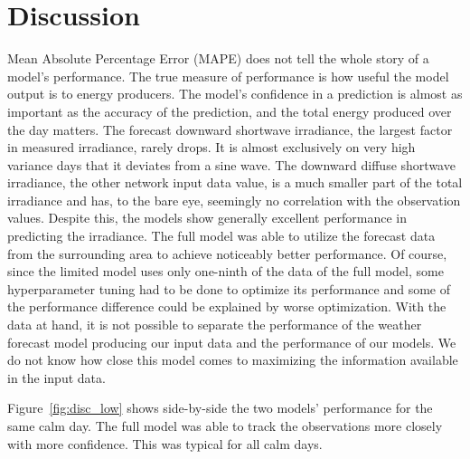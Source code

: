 \chapter{Discussion}
Mean Absolute Percentage Error (MAPE) does not tell the whole story of a model's performance. The true measure of performance is how useful the model output is to energy producers. The model's confidence in a prediction is almost as important as the accuracy of the prediction, and the total energy produced over the day matters.
The forecast downward shortwave irradiance, the largest factor in measured irradiance, rarely drops. It is almost exclusively on very high variance days that it deviates from a sine wave. The downward diffuse shortwave irradiance, the other network input data value, is a much smaller part of the total irradiance and has, to the bare eye, seemingly no correlation with the observation values. Despite this, the models show generally excellent performance in predicting the irradiance.
The full model was able to utilize the forecast data from the surrounding area to achieve noticeably better performance. Of course, since the limited model uses only one-ninth of the data of the full model, some hyperparameter tuning had to be done to optimize its performance and some of the performance difference could be explained by worse optimization.
With the data at hand, it is not possible to separate the performance of the weather forecast model producing our input data and the performance of our models. We do not know how close this model comes to maximizing the information available in the input data.



Figure~\ref{fig:disc_low} shows side-by-side the two models' performance for the same calm day. The full model was able to track the observations more closely with more confidence. This was typical for all calm days.\\

